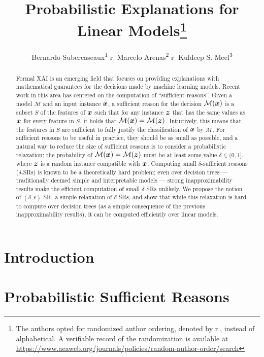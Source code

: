 \documentclass[letterpaper]{article} %
\title{Probabilistic Explanations for Linear Models\thanks{The authors
    opted for randomized author ordering, denoted by \textcircled{r},
    instead of alphabetical. A verifiable record of the randomization
    is available at \protect\url{https://www.aeaweb.org/journals/policies/random-author-order/search}}}
\author {
  Bernardo Subercaseaux\textsuperscript{\rm 1} \textcircled{r}  
  Marcelo Arenas\textsuperscript{\rm 2} \textcircled{r}  
  Kuldeep S. Meel\textsuperscript{\rm 3}
}
\newcommand{\M}{\mathcal{M}}
\begin{document}
\maketitle

\begin{abstract}
Formal XAI is an emerging field that focuses on providing explanations
with mathematical guarantees for the decisions made by machine
learning models. Recent work in this area has centered on the
computation of ``sufficient reasons''. Given a model $\M$
and an input instance ${\bm{x}}$, a sufficient reason for the decision $\M(\vx)$ is a
subset $S$ of the features of ${\bm{x}}$ such that for any instance ${\bm{z}}$
that has the same values as ${\bm{x}}$ for every feature in $S$, it holds that $\M(\vx) = \M(\vz)$. Intuitively, this means
that the features in $S$ are sufficient to fully justify the
classification of ${\bm{x}}$ by $\M$.
For sufficient reasons to be useful in practice, they should be as
small as possible, and a natural way to reduce the size of sufficient
reasons is to consider a
probabilistic relaxation; the probability of $\M(\vx) = \M(\vz)$ must
be at least some value $\delta \in (0,1]$, where ${\bm{z}}$ is a random
  instance compatible with ${\bm{x}}$.  Computing small $\delta$-sufficient reasons ($\delta$-SRs) is known to be a theoretically hard problem; even over decision trees — traditionally deemed simple and interpretable models — strong inapproximability results make the efficient computation of small $\delta$-SRs unlikely.
 We propose the notion of $(\delta, \epsilon)$-SR, a simple relaxation of $\delta$-SRs, and show that while this relaxation is hard to compute over decision trees (as a simple consequence of the previous inapproximability results), it can be computed efficiently over linear models. 
\end{abstract}


\section{Introduction}
\label{sec-into}


\section{Probabilistic Sufficient Reasons}
\label{sec-prop-SR}


\end{document}
